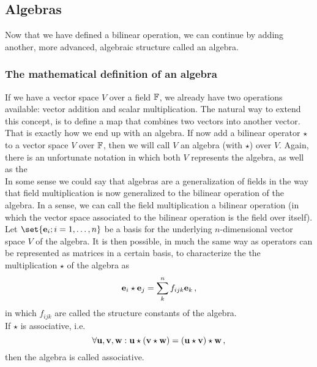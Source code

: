 \subsection{Algebras}
    Now that we have defined a bilinear operation, we can continue by adding another, more advanced, algebraic structure called an algebra.

    \subsubsection{The mathematical definition of an algebra}
        If we have a vector space $V$ over a field $\mathbb{F}$, we already have two operations available: vector addition and scalar multiplication. The natural way to extend this concept, is to define a map that combines two vectors into another vector. That is exactly how we end up with an algebra. If now add a bilinear operator $\star$ to a vector space $V$ over $\mathbb{F}$, then we will call $V$ an algebra (with $\star$) over $V$. Again, there is an unfortunate notation in which both $V$ represents the algebra, as well as the \\

        In some sense we could say that algebras are a generalization of fields in the way that field multiplication is now generalized to the bilinear operation of the algebra. In a sense, we can call the field multiplication a bilinear operation (in which the vector space associated to the bilinear operation is the field over itself). \\

        Let $\set{\vb{e}_i ; i=1,\dots,n}$ be a basis for the underlying $n$-dimensional vector space $V$ of the algebra. It is then possible, in much the same way as operators can be represented as matrices in a certain basis, to characterize the the multiplication $\star$ of the algebra as
        \begin{equation}
            \vb{e}_i \star \vb{e}_j = \sum_k^n f_{ijk} \vb{e}_k \thinspace ,
        \end{equation}
        in which $f_{ijk}$ are called the structure constants of the algebra. \\

        If $\star$ is associative, i.e.
        \begin{equation}
            \forall \vb{u}, \vb{v}, \vb{w}: \vb{u} \star (\vb{v} \star \vb{w}) = (\vb{u} \star \vb{v}) \star \vb{w} \thinspace ,
        \end{equation}
        then the algebra is called associative.

